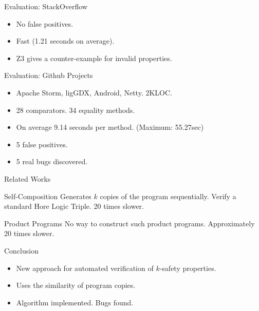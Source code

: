 \documentclass[page number]{beamer}
\begin{document}
\begin{frame}{Evaluation: StackOverflow}
  \begin{itemize}
  \item No false positives.
  \item Fast (1.21 seconds on average).
  \item Z3 gives a counter-example for invalid properties.
  \end{itemize}
\end{frame}

\begin{frame}{Evaluation: Github Projects}
  \begin{itemize}
  \item Apache Storm, ligGDX, Android, Netty. 2KLOC.
  \item  28 comparators. 34 equality methods.
  \item On average 9.14 seconds per method. (Maximum: 55.27sec)
  \item 5 false positives.
  \item 5 real bugs discovered.
  \end{itemize}
\end{frame}

\begin{frame}{Related Works}
  \begin{block}{Self-Composition}
    Generates $k$ copies of the program sequentially. Verify a standard Hore Logic Triple. 20 times slower.
  \end{block}
  \vfill
  \begin{block}{Product Programs}
    No way to construct such product programs.
    Approximately 20 times slower.
  \end{block}
\end{frame}

\begin{frame}{Conclusion}
  \begin{itemize}
  \item New approach for automated verification of $k$-safety properties.
  \item Uses the similarity of program copies.
  \item Algorithm implemented. Bugs found.
  \end{itemize}
\end{frame}
\end{document}
